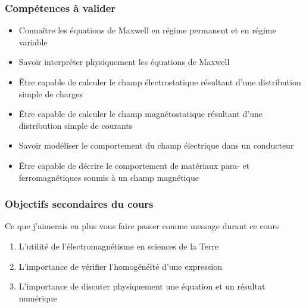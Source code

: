 \documentclass[9pt, dvipsnames,aspectratio=169]{beamer}
\begin{document}
\begin{frame}
	\frametitle{Compétences à valider}
	\vfill
	\begin{itemize}
		\item[\checkmark] Connaître les 
		  \textcolor{neworange}{équations de Maxwell} 
		  en régime permanent et en régime variable
		\item[\checkmark] Savoir interpréter physiquement les 
		 équations de Maxwell
		\item[\checkmark] Être capable de calculer le champ 
		  \textcolor{neworange}{électrostatique} 
		  résultant d'une distribution simple de charges
	        \item[\checkmark] Être capable de calculer le champ 
		  \textcolor{neworange}{magnétostatique}
		  résultant d'une distribution simple de courants
		\item[\checkmark] Savoir modéliser le comportement du 
		  \textcolor{neworange}{champ électrique dans un conducteur}
		\item[\checkmark] Être capable de décrire le comportement de 
		  \textcolor{neworange}{matériaux para- et ferromagnétiques} 
		  soumis à un champ magnétique
	\end{itemize}
\end{frame}

\begin{frame}
	\frametitle{Objectifs secondaires du cours}
	\begin{alertblock}{Ce que j'aimerais en plus vous faire passer comme 
			  message durant ce cours} 
	\begin{enumerate}
		\item L'utilité de l'électromagnétisme en 
		  sciences de la Terre
	        \item L'importance de vérifier l'homogénéité d'une 
		  expression
		\item L'importance de discuter physiquement une équation et 
		  un résultat numérique
	\end{enumerate}
        \end{alertblock}
\end{frame}
\end{document}
